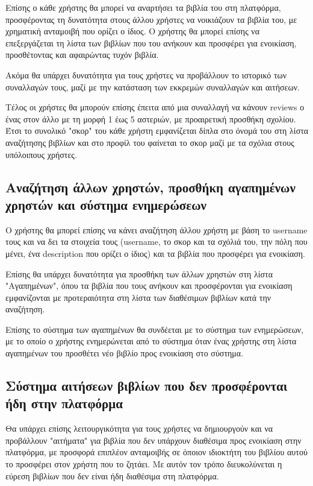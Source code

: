 \documentclass[12pt,a4paper]{article}
\begin{document}
Επίσης ο κάθε χρήστης θα μπορεί να αναρτήσει τα βιβλία του στη πλατφόρμα, προσφέροντας τη δυνατότητα στους άλλου χρήστες να νοικιάζουν τα βιβλία του, με χρηματική ανταμοιβή που ορίζει ο ίδιος. Ο χρήστης θα μπορεί επίσης να επεξεργάζεται τη λίστα των βιβλίων που του ανήκουν και προσφέρει για ενοικίαση, προσθέτοντας και αφαιρώντας τυχόν βιβλία.

Ακόμα θα υπάρχει δυνατότητα για τους χρήστες να προβάλλουν το ιστορικό των συναλλαγών τους, μαζί με την κατάσταση των εκκρεμών συναλλαγών και αιτήσεων.

Τέλος οι χρήστες θα μπορούν επίσης έπειτα από μια συναλλαγή να κάνουν reviews ο ένας στον άλλο με τη μορφή 1 έως 5 αστεριών, με προαιρετική προσθήκη σχολίου. Έτσι το συνολικό "σκορ" του κάθε χρήστη εμφανίζεται δίπλα στο όνομά του στη λίστα αναζήτησης βιβλίων και στο προφίλ του φαίνεται το σκορ μαζί με τα σχόλια στους υπόλοιπους χρήστες.

\subsection{Αναζήτηση άλλων χρηστών, προσθήκη αγαπημένων χρηστών και σύστημα ενημερώσεων}
Ο χρήστης θα μπορεί επίσης να κάνει αναζήτηση άλλου χρήστη με βάση το username τους και να δει τα στοιχεία τους (username, το σκορ και τα σχόλιά του, την πόλη που μένει, ένα description που ορίζει ο ίδιος) και τα βιβλία που προσφέρει για ενοικίαση.

Επίσης θα υπάρχει δυνατότητα για προσθήκη των άλλων χρηστών στη λίστα "Αγαπημένων", όπου τα βιβλία που τους ανήκουν και προσφέρονται για ενοικίαση εμφανίζονται με προτεραιότητα στη λίστα των διαθέσιμων βιβλίων κατά την αναζήτηση.

Επίσης το σύστημα των αγαπημένων θα συνδέεται με το σύστημα των ενημερώσεων, με το οποίο ο χρήστης ενημερώνεται από το σύστημα όταν ένας χρήστης στη λίστα αγαπημένων του προσθέτει νέο βιβλίο προς ενοικίαση στο σύστημα.

\subsection{Σύστημα αιτήσεων βιβλίων που δεν προσφέρονται ήδη στην πλατφόρμα}
Θα υπάρχει επίσης λειτουργικότητα για τους χρήστες να δημιουργούν και να προβάλλουν "αιτήματα" για βιβλία που δεν υπάρχουν διαθέσιμα προς ενοικίαση στην πλατφόρμα, με προσφορά επιπλέον ανταμοιβής σε όποιον ιδιοκτήτη του βιβλίου αυτού το προσφέρει στον χρήστη που το ζητάει. Με αυτόν τον τρόπο διευκολύνεται η εύρεση βιβλίων που δεν είναι ήδη διαθέσιμα στη πλατφόρμα.
\end{document}
